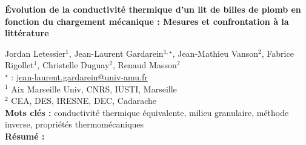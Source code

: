 


    \newpage

\BgThispage

%
\begin{flushleft}
\addtocounter{section}{1}
{\Large \textbf{Évolution de la conductivité thermique d'un lit de billes de plomb en fonction du chargement mécanique : Mesures et confrontation à la littérature}}\label{ref:70}
\end{flushleft}
%
Jordan Letessier$^{1}$, Jean-Laurent Gardarein$^{1,\star}$, Jean-Mathieu Vanson$^{2}$, Fabrice Rigollet$^{1}$, Christelle Duguay$^{2}$, Renaud Masson$^{2}$\\[2mm]
$^{\star}$ \Letter : \url{jean-laurent.gardarein@univ-amu.fr}\\[2mm]
{\footnotesize $^{1}$ Aix Marseille Univ, CNRS, IUSTI, Marseille}\\
{\footnotesize $^{2}$ CEA, DES, IRESNE, DEC, Cadarache}\\
[4mm]
%
\noindent \textbf{Mots clés : } conductivité thermique équivalente, milieu granulaire, méthode inverse, propriétés thermomécaniques\\[4mm]
%
\noindent \textbf{Résumé : } 

